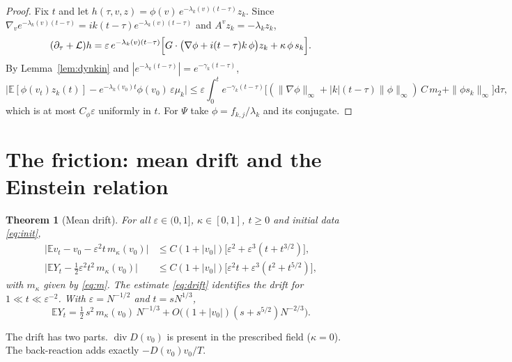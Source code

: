 \documentclass[11pt]{article}
\newcommand{\dd}{\mathrm{d}}
\newcommand{\E}{\mathbb{E}}
\newcommand{\eps}{\varepsilon}
\newcommand{\cL}{\mathcal{L}}
\newcommand{\Div}{\operatorname{div}}
\newcommand{\nrm}[2]{\|#1\|_{#2}}
\newtheorem{theorem}{Theorem}
\theoremstyle{remark}
\begin{document}
\begin{proof}
Fix $t$ and let
$h(\tau,v,z)=\phi(v)\,e^{-\lambda_k(v)(t-\tau)}z_k$. Since
$\nabla_ve^{-\lambda_k(v)(t-\tau)}=ik(t-\tau)e^{-\lambda_k(v)(t-\tau)}$ and
$A^vz_k=-\lambda_kz_k$,
\[
  (\partial_\tau+\cL)h=\eps\,e^{-\lambda_k(v)(t-\tau)}
  \Bigl[G\cdot\bigl(\nabla\phi+i(t-\tau)k\,\phi\bigr)z_k+\kappa\,\phi\,s_k\Bigr].
\]
By Lemma~\ref{lem:dynkin} and $|e^{-\lambda_k(t-\tau)}|=e^{-\gamma_k(t-\tau)}$,
\[
  \bigl|\E[\phi(v_t)z_k(t)]-e^{-\lambda_k(v_0)t}\phi(v_0)\,\eps\mu_k\bigr|
  \le\eps\int_0^te^{-\gamma_k(t-\tau)}\bigl[(\nrm{\nabla\phi}{\infty}
   +|k|(t-\tau)\nrm{\phi}{\infty})\,C\,m_2+\nrm{\phi s_k}{\infty}\bigr]\dd\tau ,
\]
which is at most $C_\phi\eps$ uniformly in $t$. For $\Psi$ take
$\phi=f_{k,j}/\lambda_k$ and its conjugate.
\end{proof}

\section{The friction: mean drift and the Einstein relation}

\begin{theorem}[Mean drift]\label{thm:drift}
For all $\eps\in(0,1]$, $\kappa\in[0,1]$, $t\ge0$ and initial data
\eqref{eq:init},
\begin{align}
  \bigl|\E v_t-v_0-\eps^2t\,m_\kappa(v_0)\bigr|
   &\le C(1+|v_0|)\bigl[\eps^2+\eps^3(t+t^{3/2})\bigr],
   \label{eq:drift}\\
  \bigl|\E Y_t-\tfrac12\eps^2t^2\,m_\kappa(v_0)\bigr|
   &\le C(1+|v_0|)\bigl[\eps^2t+\eps^3(t^2+t^{5/2})\bigr],
   \label{eq:driftY}
\end{align}
with $m_\kappa$ given by \eqref{eq:m}. The estimate \eqref{eq:drift}
identifies the drift for $1\ll t\ll\eps^{-2}$. With $\eps=N^{-1/2}$ and
$t=sN^{1/3}$,
\[
  \E Y_t=\tfrac12\,s^2\,m_\kappa(v_0)\,N^{-1/3}+O\bigl((1+|v_0|)(s+s^{5/2})N^{-2/3}\bigr).
\]
\end{theorem}

The drift has two parts. $\Div D(v_0)$ is present in the prescribed field
($\kappa=0$). The back-reaction adds exactly $-D(v_0)v_0/T$.
\end{document}
